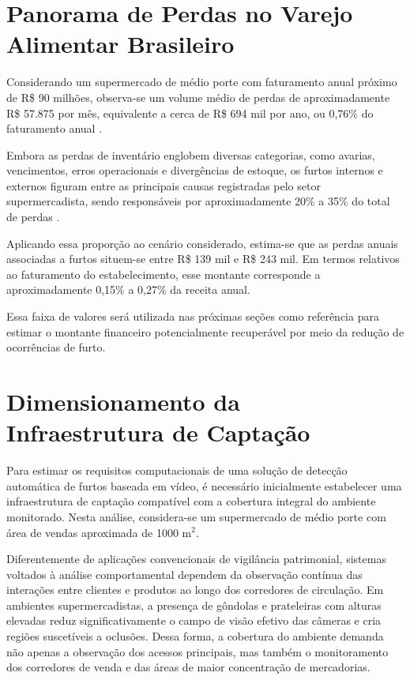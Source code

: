 \documentclass[12pt, %
openright, 
oneside, %
a4paper,    %
brazil]{facom-ufu-abntex2}
\begin{document}
\section[Panorama de Perdas no Varejo Alimentar Brasileiro]{Panorama de Perdas no Varejo Alimentar Brasileiro}
\label{sec:estimativa_perdas}
Considerando um supermercado de médio porte com faturamento anual próximo de R\$ 90 milhões, observa-se um volume médio de perdas de aproximadamente R\$ 57.875 por mês, equivalente a cerca de R\$ 694 mil por ano, ou 0,76\% do faturamento anual \cite{aires2026}.

Embora as perdas de inventário englobem diversas categorias, como avarias, vencimentos, erros operacionais e divergências de estoque, os furtos internos e externos figuram entre as principais causas registradas pelo setor supermercadista, sendo responsáveis por aproximadamente 20\% a 35\% do total de perdas \cite{abras_perdas}.

Aplicando essa proporção ao cenário considerado, estima-se que as perdas anuais associadas a furtos situem-se entre R\$ 139 mil e R\$ 243 mil. Em termos relativos ao faturamento do estabelecimento, esse montante corresponde a aproximadamente 0,15\% a 0,27\% da receita anual.

Essa faixa de valores será utilizada nas próximas seções como referência para estimar o montante financeiro potencialmente recuperável por meio da redução de ocorrências de furto.

\section[Dimensionamento da Infraestrutura de Captação]{Dimensionamento da Infraestrutura de Captação}

Para estimar os requisitos computacionais de uma solução de detecção automática de furtos baseada em vídeo, é necessário inicialmente estabelecer uma infraestrutura de captação compatível com a cobertura integral do ambiente monitorado. Nesta análise, considera-se um supermercado de médio porte com área de vendas aproximada de 1000 m$^2$.

Diferentemente de aplicações convencionais de vigilância patrimonial, sistemas voltados à análise comportamental dependem da observação contínua das interações entre clientes e produtos ao longo dos corredores de circulação. Em ambientes supermercadistas, a presença de gôndolas e prateleiras com alturas elevadas reduz significativamente o campo de visão efetivo das câmeras e cria regiões suscetíveis a oclusões. Dessa forma, a cobertura do ambiente demanda não apenas a observação dos acessos principais, mas também o monitoramento dos corredores de venda e das áreas de maior concentração de mercadorias.
\end{document}
